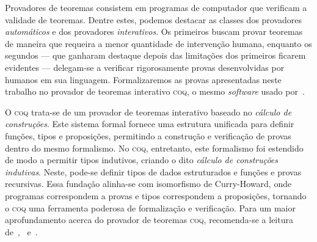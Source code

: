 Provadores de teoremas consistem em programas de computador que verificam a validade de teoremas. Dentre estes, podemos destacar as classes dos provadores \emph{automáticos} e dos provadores \emph{interativos}. Os primeiros buscam provar teoremas de maneira que requeira a menor quantidade de intervenção humana, enquanto os segundos --- que ganharam destaque depois das limitações dos primeiros ficarem evidentes --- delegam-se a verificar rigorosamente provas desenvolvidas por humanos em sua linguagem. Formalizaremos as provas apresentadas neste trabalho no provador de teoremas interativo \textsc{coq}, o mesmo \emph{software} usado por~\cite{Gonthier}.

O \textsc{coq} trata-se de um provador de teoremas interativo baseado no \emph{cálculo de construções}. Este sistema formal fornece uma estrutura unificada para definir funções, tipos e proposições, permitindo a construção e verificação de provas dentro do mesmo formalismo. No \textsc{coq}, entretanto, este formalismo foi estendido de modo a permitir tipos indutivos, criando o dito \emph{cálculo de construções indutivas}. Neste, pode-se definir tipos de dados estruturados e funções e provas recursivas. Essa fundação alinha-se com isomorfismo de Curry-Howard, onde programas correspondem a provas e tipos correspondem a proposições, tornando o \textsc{coq} uma ferramenta poderosa de formalização e verificação. Para um maior aprofundamento acerca do provador de teoremas \textsc{coq}, recomenda-se a leitura de~\cite{Chlipala},~\cite{Pierce} e~\cite{Coq}.
